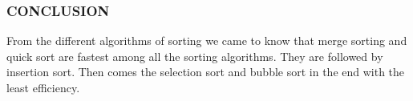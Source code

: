 \documentclass{beamer}
\begin{document}
\begin{frame}
\frametitle{CONCLUSION}

From the different algorithms of sorting we came to know that merge sorting and quick sort are fastest among all the sorting algorithms.
They are followed by insertion sort.
Then comes the selection sort and bubble sort in the end with the least efficiency.

\end{frame}
\end{document}
